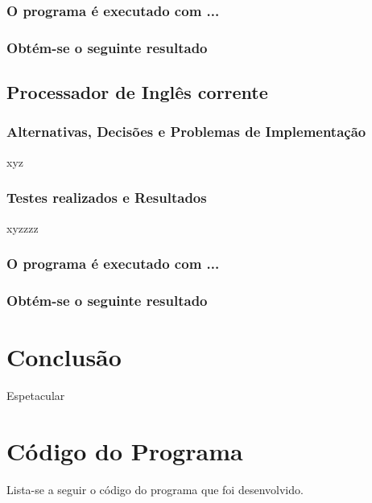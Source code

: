 \documentclass{report}
\begin{document}
\subsection{O programa é executado com ...}


\subsection{Obtém-se o seguinte resultado}

\section{Processador de Inglês corrente}

\subsection{Alternativas, Decisões e Problemas de Implementação}
xyz

\subsection{Testes realizados e Resultados}
xyzzzz

\subsection{O programa é executado com ...}


\subsection{Obtém-se o seguinte resultado}

\chapter{Conclusão} \label{concl}
Espetacular


\appendix 
\chapter{Código do Programa}

Lista-se a seguir o código  do programa  que foi desenvolvido.




\end{document}
